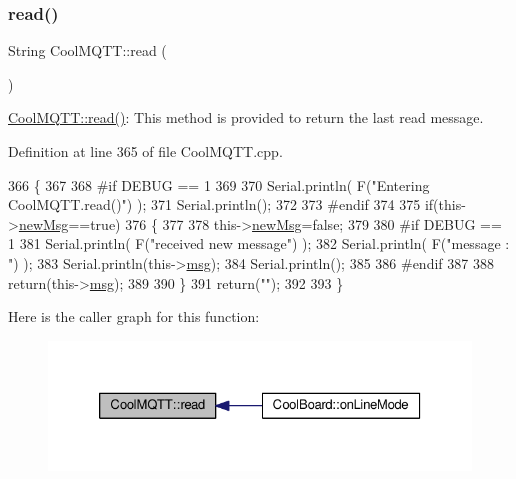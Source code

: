 \subsubsection{\texorpdfstring{read()}{read()}}
{\footnotesize\ttfamily String Cool\+M\+Q\+T\+T\+::read (\begin{DoxyParamCaption}{ }\end{DoxyParamCaption})}

\hyperlink{class_cool_m_q_t_t_ae3c18f6ae9723746d32765f1c8f176ca}{Cool\+M\+Q\+T\+T\+::read()}\+: This method is provided to return the last read message. 

Definition at line 365 of file Cool\+M\+Q\+T\+T.\+cpp.


\begin{DoxyCode}
366 \{   
367 
368 \textcolor{preprocessor}{#if DEBUG == 1 }
369 
370     Serial.println( F(\textcolor{stringliteral}{"Entering CoolMQTT.read()"}) );
371     Serial.println();
372 
373 \textcolor{preprocessor}{#endif }
374 
375     \textcolor{keywordflow}{if}(this->\hyperlink{class_cool_m_q_t_t_a3240388137b885775aadf38e96b24c6b}{newMsg}==\textcolor{keyword}{true})
376     \{
377         
378         this->\hyperlink{class_cool_m_q_t_t_a3240388137b885775aadf38e96b24c6b}{newMsg}=\textcolor{keyword}{false};
379 
380 \textcolor{preprocessor}{#if DEBUG == 1 }
381         Serial.println( F(\textcolor{stringliteral}{"received new message"}) );
382         Serial.println( F(\textcolor{stringliteral}{"message : "}) );
383         Serial.println(this->\hyperlink{class_cool_m_q_t_t_af6b19e7074dbbb4ae493c44dcb53f7ff}{msg});
384         Serial.println();
385 
386 \textcolor{preprocessor}{#endif}
387 
388         \textcolor{keywordflow}{return}(this->\hyperlink{class_cool_m_q_t_t_af6b19e7074dbbb4ae493c44dcb53f7ff}{msg});
389         
390     \}
391     \textcolor{keywordflow}{return}(\textcolor{stringliteral}{""});
392 
393 \}
\end{DoxyCode}
Here is the caller graph for this function\+:\nopagebreak
\begin{figure}[H]
\begin{center}
\leavevmode
\includegraphics[width=326pt]{d0/dd0/class_cool_m_q_t_t_ae3c18f6ae9723746d32765f1c8f176ca_icgraph}
\end{center}
\end{figure}
\mbox{\label{class_cool_m_q_t_t_a5d003307eff78efbd585e42b43b72b6d}} 
